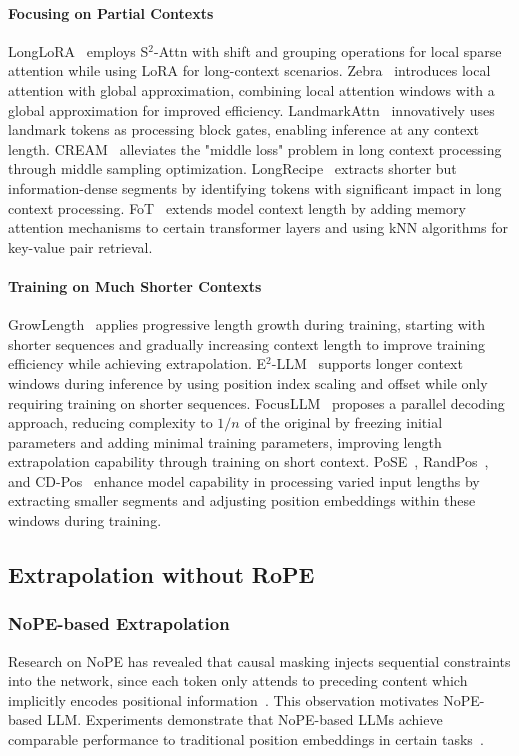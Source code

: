 \paragraph{Focusing on Partial Contexts} LongLoRA~\citep{chenlonglora} employs S$^2$-Attn with shift and grouping operations for local sparse attention while using LoRA for long-context scenarios. Zebra~\citep{song2023zebra} introduces local attention with global approximation, combining local attention windows with a global approximation for improved efficiency. LandmarkAttn~\citep{mohtashami2023random} innovatively uses landmark tokens as processing block gates, enabling inference at any context length. CREAM~\citep{wuefficient} alleviates the "middle loss" problem in long context processing through middle sampling optimization. LongRecipe~\citep{hu2024longrecipe} extracts shorter but information-dense segments by identifying tokens with significant impact in long context processing. FoT~\citep{tworkowski2024focused} extends model context length by adding memory attention mechanisms to certain transformer layers and using kNN algorithms for key-value pair retrieval.

\paragraph{Training on Much Shorter Contexts} GrowLength~\citep{jin2023growlength} applies progressive length growth during training, starting with shorter sequences and gradually increasing context length to improve training efficiency while achieving extrapolation. E$^2$-LLM~\citep{liu20242} supports longer context windows during inference by using position index scaling and offset while only requiring training on shorter sequences. FocusLLM~\citep{li2024focusllm} proposes a parallel decoding approach, reducing complexity to $1/n$ of the original by freezing initial parameters and adding minimal training parameters, improving length extrapolation capability through training on short context. PoSE~\citep{zhu2023pose}, RandPos~\citep{ruoss2023randomized}, and CD-Pos~\citep{hu2024cd} enhance model capability in processing varied input lengths by extracting smaller segments and adjusting position embeddings within these windows during training.

\subsection{Extrapolation without RoPE}\label{sec2_4}

\subsubsection{NoPE-based Extrapolation}
Research on NoPE has revealed that causal masking injects sequential constraints into the network, since each token only attends to preceding content which implicitly encodes positional information~\citep{haviv2022transformer, chi2023latent}. This observation motivates NoPE-based LLM. Experiments demonstrate that NoPE-based LLMs achieve comparable performance to traditional position embeddings in certain tasks~\citep{kazemnejad2024impact}.

